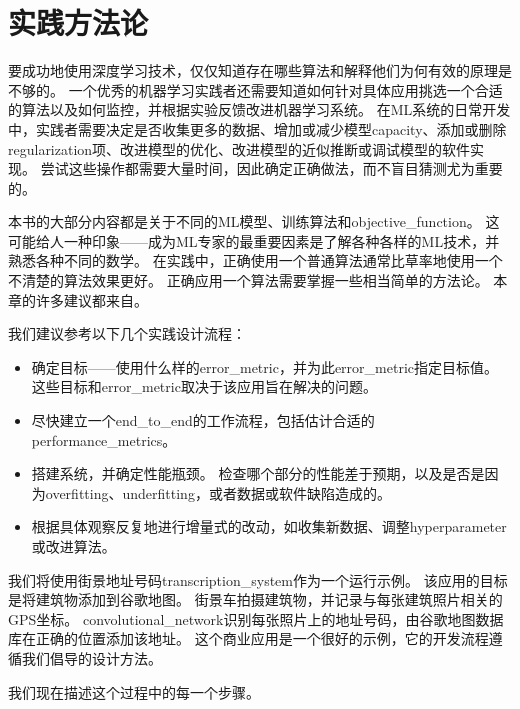 \chapter{实践方法论}
\label{chap:practical_methodology}
要成功地使用深度学习技术，仅仅知道存在哪些算法和解释他们为何有效的原理是不够的。
一个优秀的机器学习实践者还需要知道如何针对具体应用挑选一个合适的算法以及如何监控，并根据实验反馈改进机器学习系统。
在\gls{ML}系统的日常开发中，实践者需要决定是否收集更多的数据、增加或减少模型\gls{capacity}、添加或删除\gls{regularization}项、改进模型的优化、改进模型的近似推断或调试模型的软件实现。
尝试这些操作都需要大量时间，因此确定正确做法，而不盲目猜测尤为重要的。


本书的大部分内容都是关于不同的\gls{ML}模型、训练算法和\gls{objective_function}。
这可能给人一种印象——成为\gls{ML}专家的最重要因素是了解各种各样的\gls{ML}技术，并熟悉各种不同的数学。
在实践中，正确使用一个普通算法通常比草率地使用一个不清楚的算法效果更好。
正确应用一个算法需要掌握一些相当简单的方法论。
本章的许多建议都来自\cite{ng-lecture-advice}。


我们建议参考以下几个实践设计流程：
\begin{itemize}
\item 确定目标——使用什么样的\gls{error_metric}，并为此\gls{error_metric}指定目标值。
这些目标和\gls{error_metric}取决于该应用旨在解决的问题。


\item 尽快建立一个\gls{end_to_end}的工作流程，包括估计合适的\gls{performance_metrics}。

\item 搭建系统，并确定性能瓶颈。
检查哪个部分的性能差于预期，以及是否是因为\gls{overfitting}、\gls{underfitting}，或者数据或软件缺陷造成的。

\item 根据具体观察反复地进行增量式的改动，如收集新数据、调整\gls{hyperparameter}或改进算法。
\end{itemize}


我们将使用街景地址号码\gls{transcription_system}\citep{Goodfellow+et+al-ICLR2014a}作为一个运行示例。
该应用的目标是将建筑物添加到谷歌地图。
街景车拍摄建筑物，并记录与每张建筑照片相关的GPS坐标。
\gls{convolutional_network}识别每张照片上的地址号码，由谷歌地图数据库在正确的位置添加该地址。
这个商业应用是一个很好的示例，它的开发流程遵循我们倡导的设计方法。

我们现在描述这个过程中的每一个步骤。



